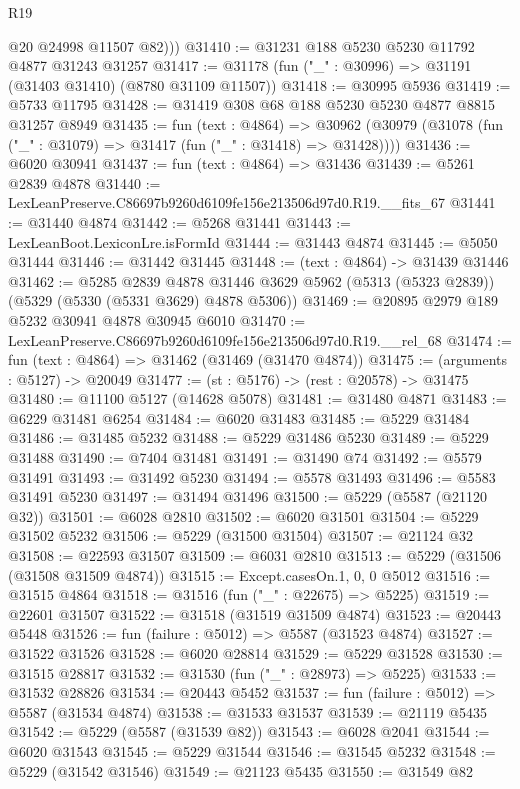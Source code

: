 \begin{lexlean}{R19}
\begin{coremodule}
          @20
          @24998
          @11507
          @82)))
@31410 := @31231 @188 @5230 @5230 @11792 @4877 @31243 @31257
@31417 := @31178 (fun ("_" : @30996) => @31191 (@31403 @31410) (@8780 @31109 @11507))
@31418 := @30995 @5936
@31419 := @5733 @11795
@31428 := @31419 @308 @68 @188 @5230 @5230 @4877 @8815 @31257 @8949
@31435 := fun (text : @4864) =>
  @30962 (@30979 (@31078 (fun ("_" : @31079) => @31417 (fun ("_" : @31418) => @31428))))
@31436 := @6020 @30941
@31437 := fun (text : @4864) => @31436
@31439 := @5261 @2839 @4878
@31440 := LexLeanPreserve.C86697b9260d6109fe156e213506d97d0.R19.__fits_67
@31441 := @31440 @4874
@31442 := @5268 @31441
@31443 := LexLeanBoot.LexiconLre.isFormId
@31444 := @31443 @4874
@31445 := @5050 @31444
@31446 := @31442 @31445
@31448 := (text : @4864) -> @31439 @31446
@31462 := @5285
    @2839
    @4878
    @31446
    @3629
    @5962
    (@5313 (@5323 @2839))
    (@5329 (@5330 (@5331 @3629) @4878 @5306))
@31469 := @20895 @2979 @189 @5232 @30941 @4878 @30945 @6010
@31470 := LexLeanPreserve.C86697b9260d6109fe156e213506d97d0.R19.__rel_68
@31474 := fun (text : @4864) => @31462 (@31469 (@31470 @4874))
@31475 := (arguments : @5127) -> @20049
@31477 := (st : @5176) -> (rest : @20578) -> @31475
@31480 := @11100 @5127 (@14628 @5078)
@31481 := @31480 @4871
@31483 := @6229 @31481 @6254
@31484 := @6020 @31483
@31485 := @5229 @31484
@31486 := @31485 @5232
@31488 := @5229 @31486 @5230
@31489 := @5229 @31488
@31490 := @7404 @31481
@31491 := @31490 @74
@31492 := @5579 @31491
@31493 := @31492 @5230
@31494 := @5578 @31493
@31496 := @5583 @31491 @5230
@31497 := @31494 @31496
@31500 := @5229 (@5587 (@21120 @32))
@31501 := @6028 @2810
@31502 := @6020 @31501
@31504 := @5229 @31502 @5232
@31506 := @5229 (@31500 @31504)
@31507 := @21124 @32
@31508 := @22593 @31507
@31509 := @6031 @2810
@31513 := @5229 (@31506 (@31508 @31509 @4874))
@31515 := Except.casesOn.{1, 0, 0} @5012
@31516 := @31515 @4864
@31518 := @31516 (fun ("_" : @22675) => @5225)
@31519 := @22601 @31507
@31522 := @31518 (@31519 @31509 @4874)
@31523 := @20443 @5448
@31526 := fun (failure : @5012) => @5587 (@31523 @4874)
@31527 := @31522 @31526
@31528 := @6020 @28814
@31529 := @5229 @31528
@31530 := @31515 @28817
@31532 := @31530 (fun ("_" : @28973) => @5225)
@31533 := @31532 @28826
@31534 := @20443 @5452
@31537 := fun (failure : @5012) => @5587 (@31534 @4874)
@31538 := @31533 @31537
@31539 := @21119 @5435
@31542 := @5229 (@5587 (@31539 @82))
@31543 := @6028 @2041
@31544 := @6020 @31543
@31545 := @5229 @31544
@31546 := @31545 @5232
@31548 := @5229 (@31542 @31546)
@31549 := @21123 @5435
@31550 := @31549 @82

\end{coremodule}
\end{lexlean}
